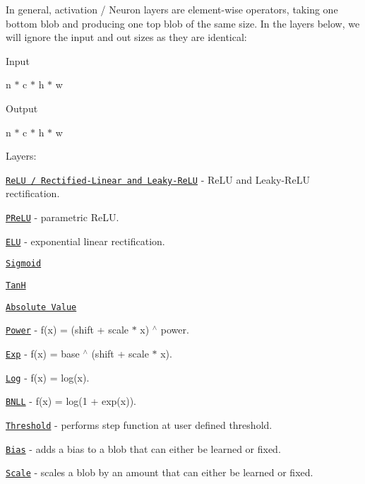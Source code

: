 In general, activation / Neuron layers are element-\/wise operators, taking one bottom blob and producing one top blob of the same size. In the layers below, we will ignore the input and out sizes as they are identical\+:


\begin{DoxyItemize}
\item Input
\begin{DoxyItemize}
\item n $\ast$ c $\ast$ h $\ast$ w
\end{DoxyItemize}
\item Output
\begin{DoxyItemize}
\item n $\ast$ c $\ast$ h $\ast$ w
\end{DoxyItemize}
\end{DoxyItemize}

Layers\+:


\begin{DoxyItemize}
\item \href{layers/relu.html}{\tt Re\+LU / Rectified-\/\+Linear and Leaky-\/\+Re\+LU} -\/ Re\+LU and Leaky-\/\+Re\+LU rectification.
\item \href{layers/prelu.html}{\tt P\+Re\+LU} -\/ parametric Re\+LU.
\item \href{layers/elu.html}{\tt E\+LU} -\/ exponential linear rectification.
\item \href{layers/sigmoid.html}{\tt Sigmoid}
\item \href{layers/tanh.html}{\tt TanH}
\item \href{layers/absval.html}{\tt Absolute Value}
\item \href{layers/power.html}{\tt Power} -\/ f(x) = (shift + scale $\ast$ x) $^\wedge$ power.
\item \href{layers/exp.html}{\tt Exp} -\/ f(x) = base $^\wedge$ (shift + scale $\ast$ x).
\item \href{layers/log.html}{\tt Log} -\/ f(x) = log(x).
\item \href{layers/bnll.html}{\tt B\+N\+LL} -\/ f(x) = log(1 + exp(x)).
\item \href{layers/threshold.html}{\tt Threshold} -\/ performs step function at user defined threshold.
\item \href{layers/bias.html}{\tt Bias} -\/ adds a bias to a blob that can either be learned or fixed.
\item \href{layers/scale.html}{\tt Scale} -\/ scales a blob by an amount that can either be learned or fixed.
\end{DoxyItemize}

